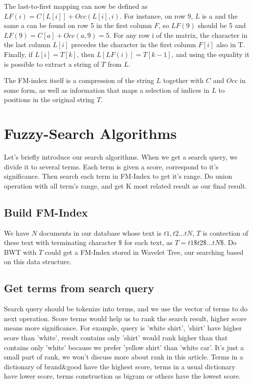 The last-to-first mapping can now be defined as \(LF(i) = C[L[i]] + Occ(L[i], i)\). For instance, on row 9, \(L\) is a and the same a can be found on row 5 in the first column \(F\), so \(LF(9)\) should be 5 and \(LF(9) = C[a] + Occ(a, 9) = 5\). For any row i of the matrix, the character in the last column \(L[i]\) precedes the character in the first column \(F[i]\) also in T. Finally, if \(L[i] = T[k]\), then \(L[LF(i)] = T[k - 1]\), and using the equality it is possible to extract a string of \(T\) from \(L\).

The FM-index itself is a compression of the string \(L\) together with \(C\) and \(Occ\) in some form, as well as information that maps a selection of indices in \(L\) to positions in the original string \(T\).

\section{Fuzzy-Search Algorithms}

Let's briefly introduce our search algorithms. When we get a search query, we divide it to several terms. Each term is given a score, correspond to it's significance. Then search each term in FM-Index to get it's range. Do union operation with all term's range, and get K most related result as our final result.

\subsection{Build FM-Index}

We have \(N\) documents in our database whose text is \(t1,t2...tN\), \(T\) is contection of these text with terminating character \(\$\) for each text, as \(T=t1\$t2\$...tN\$\). Do BWT with \(T\) could get a FM-Index stored in Wavelet Tree, our searching based on this data structure.

\subsection{Get terms from search query}

Search query should be tokenize into terms, and we use the vector of terms to do next operation. Score terms would help us to rank the search result, higher score means more significance. For example, query is 'white shirt', 'shirt' have higher score than 'white', result contains only 'shirt' would rank higher than that contains only 'white' because we prefer 'yellow shirt' than 'white car'. It's just a small part of rank, we won't discuss more about rank in this article. Terms in a dictionary of brand\&good have the highest score, terms in a usual dictionary have lower score, terms construction as bigram or others have the lowest score.

